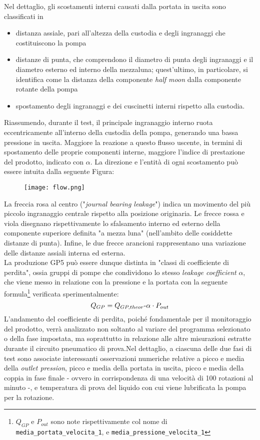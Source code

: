 \documentclass[fleqn,10pt]{SelfArx} %
\begin{document}
Nel dettaglio, gli scostamenti interni causati dalla portata in uscita sono classificati in
\begin{itemize}
    \item distanza assiale, pari all'altezza della custodia e degli ingranaggi che costituiscono la pompa
    \item distanze di punta, che comprendono il diametro di punta degli ingranaggi e il diametro esterno ed interno della mezzaluna; quest'ultimo, in particolare, si identifica come la distanza della componente \textit{half moon} dalla componente rotante della pompa
    \item spostamento degli ingranaggi e dei cuscinetti interni rispetto alla custodia.
\end{itemize}
Riassumendo, durante il test, il principale ingranaggio interno ruota eccentricamente all'interno della custodia della pompa, generando una bassa pressione in uscita. Maggiore la reazione a questo flusso uscente, in termini di spostamento delle proprie componenti interne, maggiore l'indice di prestazione del prodotto, indicato con $\alpha$. La direzione e l'entità di ogni scostamento può essere intuita dalla seguente Figura:
\begin{figure}[H]
    \centering
    \texttt{[image: flow.png]}
    \label{fig:em}
\end{figure}
La freccia rosa al centro ("\textit{journal bearing leakage}") indica un movimento del più piccolo ingranaggio centrale rispetto alla posizione originaria. Le frecce rossa e viola disegnano rispettivamente lo sfalsamento interno ed esterno della componente superiore definita "a mezza luna" (nell'ambito delle cosiddette distanze di punta). Infine, le due frecce arancioni rappresentano una variazione delle distanze assiali interna ed esterna.\\
La produzione GP5 può essere dunque distinta in "classi di coefficiente di perdita", ossia gruppi di pompe che condividono lo stesso \textit{leakage coefficient} $\alpha$, che viene messo in relazione con la pressione e la portata con la seguente formula\footnote{$Q_{GP}$ e $P_{out}$ sono note rispettivamente col nome di \texttt{media\_portata\_velocita\_1}, e \texttt{media\_pressione\_velocita\_1}} verificata sperimentalmente:
\begin{equation}\label{TL}
    Q_{GP} = Q_{GP,theor} {\text -} \alpha \cdot P_{out}
\end{equation}
L'andamento del coefficiente di perdita, poiché fondamentale per il monitoraggio del prodotto, verrà analizzato non soltanto al variare del programma selezionato o della fase impostata, ma soprattutto in relazione alle altre misurazioni estratte durante il circuito pneumatico di prova.Nel dettaglio, a ciascuna delle due fasi di test sono associate interessanti osservazioni numeriche relative a picco e media della \textit{outlet pression}, picco e media della portata in uscita, picco e media della coppia in fase finale - ovvero in corrispondenza di una velocità di 100 rotazioni al minuto -, e temperatura di prova del liquido con cui viene lubrificata la pompa per la rotazione.
\end{document}

